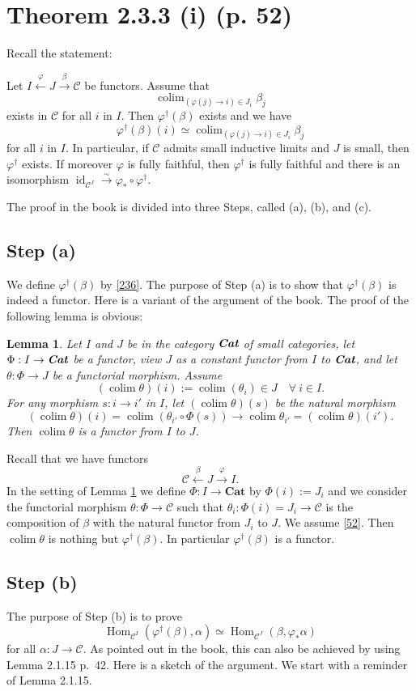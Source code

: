 \documentclass[12pt]{article}
\newtheorem{lem}[thm]{Lemma}
\theoremstyle{remark}%
\newcommand{\C}{\mathcal C}
\newcommand{\Cat}{\textbf{Cat}}
\newcommand{\p}{\varphi}
\newcommand{\xr}{\xrightarrow}
\newcommand{\be}{\begin{equation}}
\newcommand{\ee}{\end{equation}}
\DeclareMathOperator*{\co}{colim}
\DeclareMathOperator{\id}{id}
\DeclareMathOperator{\h}{Hom}
\begin{document}
\section{Theorem 2.3.3 (i) (p. 52)}\label{233i}%
%
Recall the statement: 

Let $I\xleftarrow\p J\xr\beta\C$ be functors. Assume that 
$$
\co_{(\p(j)\to i)\in J_i}\beta_j
$$ 
exists in $\C$ for all $i$ in $I$. Then $\p^\dagger(\beta)$ exists and we have 
% 
\be\label{236} 
\p^\dagger(\beta)(i)\simeq\co_{(\p(j)\to i)\in J_i}\beta_j
\ee 
% 
for all $i$ in $I$. In particular, if $\C$ admits small inductive limits and $J$ is small, then 
$\p^\dagger$ exists. If moreover $\p$ is fully faithful, then $\p^\dagger$ is fully faithful and there is an isomorphism $\id_{\C^J}\xr\sim\p_*\circ\p^\dagger$. 

The proof in the book is divided into three Steps, called (a), (b), and (c). 
% 
\subsection{Step (a)}\label{scji}%
% 
We define $\p^\dagger(\beta)$ by \eqref{236}. The purpose of Step (a) is to show that $\p^\dagger(\beta)$ is indeed a functor. Here is a variant of the argument of the book. The proof of the following lemma is obvious: 
% 
\begin{lem}\label{r52} 
%
Let $I$ and $J$ be in the category $\textbf{\em Cat}$ of small categories, let $\Phi:I\to\textbf{\em Cat}$ be a functor, view $J$ as a constant functor from $I$ to $\textbf{\em Cat}$, and let $\theta:\Phi\to J$ be a functorial morphism. Assume 
%
\be\label{52} 
(\co\theta)(i):=\co(\theta_i)\in J\quad\forall\ i\in I. 
\ee 
% 
For any morphism $s:i\to i'$ in $I$, let $(\co\theta)(s)$ be the natural morphism 
$$
(\co\theta)(i)=\co(\theta_{i'}\circ\Phi(s))\to
\co\theta_{i'}=(\co\theta)(i'). 
$$  
Then $\co\theta$ is a functor from $I$ to $J$. 
%
\end{lem} 
%
Recall that we have functors 
$$
\C\xleftarrow\beta J\xrightarrow\p I. 
$$ 
In the setting of Lemma \ref{r52} we define $\Phi:I\to\Cat$ by $\Phi(i):=J_i$ and we consider the functorial morphism $\theta:\Phi\to\C$ such that $\theta_i:\Phi(i)=J_i\to\C$ is the composition of $\beta$ with the natural functor from $J_i$ to $J$. We assume \eqref{52}. Then $\co\theta$ is nothing but $\p^\dagger(\beta)$. In particular $\p^\dagger(\beta)$ is a functor. 
% 
\subsection{Step (b)}%
% 
The purpose of Step (b) is to prove 
% 
\be\label{stepb}
\h_{\C^I}(\p^\dagger(\beta),\alpha)\simeq\h_{\C^J}(\beta,\p_*\alpha) 
\ee 
%  
for all $\alpha:J\to\C$. As pointed out in the book, this can also be achieved by using Lemma 2.1.15 p.~42. Here is a sketch of the argument. We start with a reminder of Lemma 2.1.15. 
\end{document}
